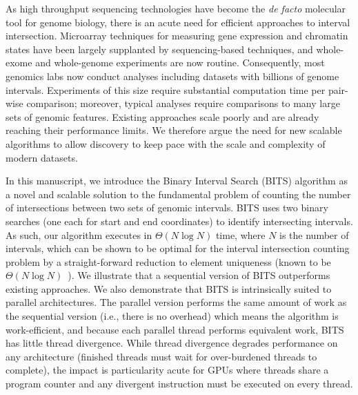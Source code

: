 \documentclass{bioinfo}
\begin{document}
As high throughput sequencing technologies have become the 
\emph{de facto} molecular tool for genome biology, there is an acute need for 
efficient approaches to interval intersection. Microarray
techniques for measuring gene expression and chromatin
states have been largely supplanted by sequencing-based techniques, 
and whole-exome and whole-genome
experiments are now routine. Consequently, most genomics labs now conduct
analyses including datasets with billions of genome intervals.
Experiments of this size require substantial computation time per pair-wise
comparison; moreover, typical analyses require comparisons to many large sets of
genomic features. Existing approaches scale poorly and
are already reaching their performance limits. We therefore argue
the need for new scalable algorithms to allow discovery to keep pace with the
scale and complexity of modern datasets.

In this manuscript, we introduce the Binary Interval Search (BITS) algorithm as
a novel and scalable solution to the fundamental problem of counting the number
of intersections between two sets of genomic intervals.  BITS uses two binary searches (one each for start and end coordinates) to identify intersecting intervals. As such, our algorithm executes
in $\Theta(N \log N)$ time, where $N$ is the number of intervals, which can be
shown to be optimal for the interval intersection counting problem by a
straight-forward reduction to element uniqueness (known to be
$\Theta(N\log N)$~\citep{misra1982}).  We illustrate that a sequential version 
of BITS outperforms existing approaches. We also demonstrate that BITS 
is intrinsically suited to parallel architectures. The parallel 
version performs the same amount of work as the sequential version 
(i.e., there is no overhead) which means the algorithm is work-efficient, and 
because each parallel thread performs equivalent work, BITS has little thread 
divergence. While thread divergence degrades performance on any architecture 
(finished threads must wait for over-burdened threads to complete),
the impact is particularity acute for GPUs where threads share a program counter
and any divergent instruction must be executed on every thread.

\end{document}
